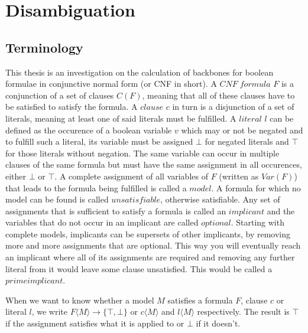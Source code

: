 \section{Disambiguation}
\subsection{Terminology}
This thesis is an investigation on the calculation of backbones for boolean formulae in conjunctive normal form (or CNF in short). A $CNF\;formula$ $F$ is a conjunction of a set of clauses $C(F)$, meaning that all of these clauses have to be satisfied to satisfy the formula. A $clause$ $c$ in turn is a disjunction of a set of literals, meaning at least one of said literals must be fulfilled. A $literal$ $l$ can be defined as the occurence of a boolean variable $v$ which may or not be negated and to fulfill such a literal, its variable must be assigned $\bot$ for negated literals and $\top$ for those literals without negation. The same variable can occur in multiple clauses of the same formula but must have the same assignment in all occurences, either $\bot$ or $\top$. A complete assignment of all variables of $F$ (written as $Var(F)$) that leads to the formula being fulfilled is called a $model$. A formula for which no model can be found is called $unsatisfiable$, otherwise satisfiable. 
Any set of assignments that is sufficient to satisfy a formula is called an $implicant$ and the variables that do not occur in an implicant are called $optional$. Starting with complete models, implicants can be supersets of other implicants, by removing more and more assignments that are optional. This way you will eventually reach an implicant where all of its assignments are required and removing any further literal from it would leave some clause unsatisfied. This would be called a $prime implicant$.


When we want to know whether a model $M$ satisfies a formula $F$, clause $c$ or literal $l$, we write $F\langle M\rangle \rightarrow \{\top,\bot\}$ or $c\langle M\rangle$ and $l\langle M\rangle$ respectively. The result is $\top$ if the assignment satisfies what it is applied to or $\bot$ if it doesn't.


